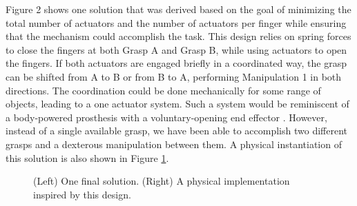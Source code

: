 Figure 2 shows one solution that was derived based on the goal of minimizing the total number of actuators and the number of actuators per finger while ensuring that the mechanism could accomplish the task.  This design relies on spring forces to close the fingers at both Grasp A and Grasp B, while using actuators to open the fingers.   If both actuators are engaged briefly in a coordinated way, the grasp can be shifted from A to B or from B to A, performing Manipulation 1 in both directions.   The coordination could be done mechanically for some range of objects, leading to a one actuator system.   Such a system would be reminiscent of a body-powered prosthesis with a voluntary-opening end effector \cite{smith2004atlas}.   However, instead of a single available grasp, we have been able to accomplish two different grasps and a dexterous manipulation between them.
A physical instantiation of this solution is also shown in Figure \ref{SimpleExampleResults}.

\begin{figure}
\begin{center}
\vspace*{2in}
\end{center}
\caption[]{(Left) One final solution.  (Right) A physical implementation inspired by this design.}
\label{SimpleExampleResults}
\end{figure}



